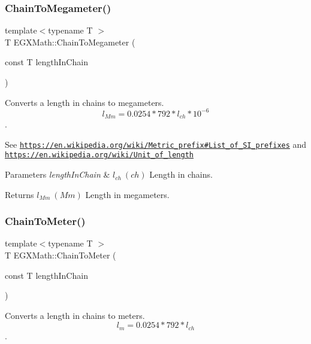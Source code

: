 \subsubsection{\texorpdfstring{Chain\+To\+Megameter()}{ChainToMegameter()}}
{\footnotesize\ttfamily template$<$typename T $>$ \\
T E\+G\+X\+Math\+::\+Chain\+To\+Megameter (\begin{DoxyParamCaption}\item[{const T}]{length\+In\+Chain }\end{DoxyParamCaption})}



Converts a length in chains to megameters. \[ l_{Mm}=0.0254 * 792 * l_{ch} * 10^{-6} \]. 

See \href{https://en.wikipedia.org/wiki/Metric_prefix#List_of_SI_prefixes}{\tt https\+://en.\+wikipedia.\+org/wiki/\+Metric\+\_\+prefix\#\+List\+\_\+of\+\_\+\+S\+I\+\_\+prefixes} and \href{https://en.wikipedia.org/wiki/Unit_of_length}{\tt https\+://en.\+wikipedia.\+org/wiki/\+Unit\+\_\+of\+\_\+length} 
\begin{DoxyParams}{Parameters}
{\em length\+In\+Chain} & $ l_{ch}\ (ch)$ Length in chains. \\
\hline
\end{DoxyParams}
\begin{DoxyReturn}{Returns}
$ l_{Mm}\ (Mm)$ Length in megameters. 
\end{DoxyReturn}
\mbox{\label{group___e_g_x_math-_conversions-_length_conversions-_surveyors-_chain-_s_i_ga94f1a1b0e10796717226224d825e0490}} 
\subsubsection{\texorpdfstring{Chain\+To\+Meter()}{ChainToMeter()}}
{\footnotesize\ttfamily template$<$typename T $>$ \\
T E\+G\+X\+Math\+::\+Chain\+To\+Meter (\begin{DoxyParamCaption}\item[{const T}]{length\+In\+Chain }\end{DoxyParamCaption})}



Converts a length in chains to meters. \[ l_{m}=0.0254 * 792 * l_{ch} \]. 


